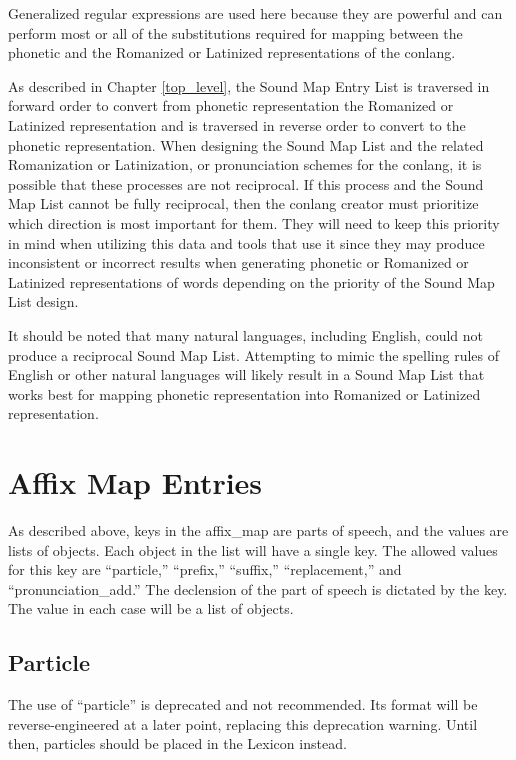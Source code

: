 Generalized regular expressions are used here because they are powerful and can perform most or all of the substitutions required for mapping between the phonetic and the Romanized or Latinized representations of the conlang.  

As described in Chapter \ref{top_level}, the Sound Map Entry List is traversed in forward order to convert from phonetic representation the Romanized or Latinized representation and is traversed in reverse order to convert to the phonetic representation.  When designing the Sound Map List and the related Romanization or Latinization, or pronunciation schemes for the conlang, it is possible that these processes are not reciprocal.  If this process and the Sound Map List cannot be fully reciprocal, then the conlang creator must prioritize which direction is most important for them.  They will need to keep this priority in mind when utilizing this data and tools that use it since they may produce inconsistent or incorrect results when generating phonetic or Romanized or Latinized representations of words depending on the priority of the Sound Map List design.

It should be noted that many natural languages, including English, could not produce a reciprocal Sound Map List.  Attempting to mimic the spelling rules of English or other natural languages will likely result in a Sound Map List that works best for mapping phonetic representation into Romanized or Latinized representation.

\chapter{Affix Map Entries}
As described above, keys in the affix\_map are parts of speech, and the values are lists of objects.  Each object in the list will have a single key.  The allowed values for this key are ``particle,'' ``prefix,'' ``suffix,'' ``replacement,'' and ``pronunciation\_add.''  The declension of the part of speech is dictated by the key.  The value in each case will be a list of objects.

\section{Particle}

The use of ``particle'' is deprecated and not recommended.  Its format will be reverse-engineered at a later point, replacing this deprecation warning.  Until then, particles should be placed in the Lexicon instead.

